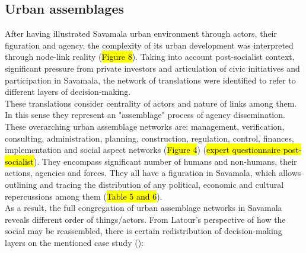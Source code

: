 \documentclass[11pt]{report}
\begin{document}
\subsection{Urban assemblages}

After having illustrated Savamala urban environment through actors, their figuration and agency, the complexity of its urban development was interpreted through node-link reality (\hl{Figure 8}).
Taking into account post-socialist context, significant pressure from private investors and articulation of civic initiatives and participation in Savamala, the network of translations were identified to refer to different layers of decision-making.
\\

These translations consider centrality of actors and nature of links among them. In this sense they represent an "assemblage" process of agency dissemination.
These overarching urban assemblage networks are: management, verification, consulting, administration, planning, construction, regulation, control, finances, implementation and social aspect networks (\hl{Figure 4}) (\hl{expert questionnaire post-socialist}).
They encompass significant number of humans and non-humans, their actions, agencies and forces. 
They all have a figuration in Savamala, which allows outlining and tracing the distribution of any political, economic and cultural repercussions among them (\hl{Table 5 and 6}).
\\ 

As a result, the full congregation of urban assemblage networks in Savamala reveals different order of things/actors. From Latour's perspective of how the social may be reassembled, there is certain redistribution of decision-making layers on the mentioned case study (\cite{Latour 2005}):
\end{document}
